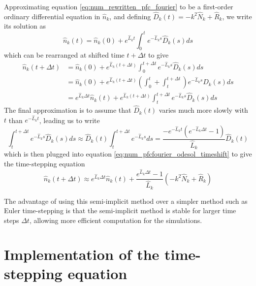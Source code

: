 Approximating equation \ref{eq:num_rewritten_pfc_fourier} to be a first-order ordinary differential equation in $\hat{n}_k$, and defining $\hat{D}_k(t)=- k^2 \hat{N}_k + \hat{R}_k$, we write its solution as
\begin{equation}\label{eq:num_pfcfourier_odesol}
\hat{n}_k(t)=\hat{n}_k(0) + e^{\hat{L}_k t}\int_0^t e^{-\hat{L}_k s}\hat{D}_k(s) ds
\end{equation}
which can be rearranged at shifted time $t+\Delta t$ to give
\begin{equation}\label{eq:num_pfcfourier_odesol_timeshift}
\begin{split}
\hat{n}_k(t+\Delta t)&=\hat{n}_k(0) + e^{\hat{L}_k (t+\Delta t)}\int_0^{t+\Delta t} e^{-\hat{L}_k s}\hat{D}_k(s) ds
\\&=\hat{n}_k(0) + e^{\hat{L}_k (t+\Delta t)} \left(\int_0^{t}+\int_t^{t+\Delta t} \right) e^{-\hat{L}_k s}\hat{D}_k(s) ds
\\&=e^{\hat{L}_k \Delta t}\hat{n}_k(t) + e^{\hat{L}_k (t+\Delta t)} \int_t^{t+\Delta t} e^{-\hat{L}_k s}\hat{D}_k(s) ds
\end{split}
\end{equation}
The final approximation is to assume that $\hat{D}_k(t)$ varies much more slowly with $t$ than $e^{-\hat{L}_k t}$, leading us to write
\begin{equation}
\int_t^{t+\Delta t} e^{-\hat{L}_k s}\hat{D}_k(s) ds \approx \hat{D}_k(t)\int_t^{t+\Delta t} e^{-\hat{L}_k s} ds = \frac{-e^{-\hat{L}_k t}(e^{-\hat{L}_k \Delta t}-1)}{\hat{L}_k}  \hat{D}_k(t)
\end{equation}
which is then plugged into equation \ref{eq:num_pfcfourier_odesol_timeshift} to give the time-stepping equation
\begin{equation}\label{eq:num_pfc_final}
\hat{n}_k(t+\Delta t)\approx e^{\hat{L}_k \Delta t}\hat{n}_k(t) +\frac{e^{\hat{L}_k \Delta t}-1}{\hat{L}_k} ( - k^2 \hat{N}_k + \hat{R}_k )
\end{equation}

The advantage of using this semi-implicit method over a simpler method such as Euler time-stepping is that the semi-implicit method is stable for larger time steps $\Delta t$, allowing more efficient computation for the simulations.

\section{Implementation of the time-stepping equation}\label{sec:num_discret}

